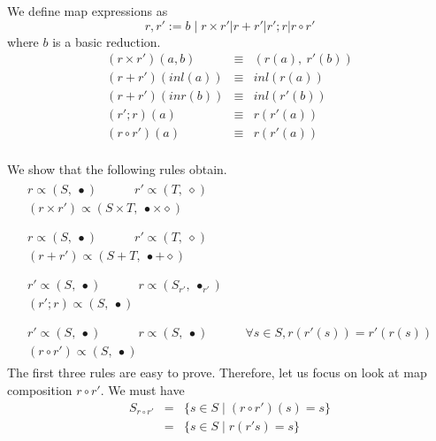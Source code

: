 We define map expressions as 
\[
r, r' := b \mid r \times r' | r + r' | r' ; r | r \circ r'
\]
where $b$ is a basic reduction. 
\[
\begin{array}{rcl}
  ( r \times r') (a, b) & \equiv & (r(a),\ r'(b)) \\
  ( r + r') (inl(a)) & \equiv & inl (r (a)) \\
  ( r + r') (inr(b)) & \equiv & inl (r' (b)) \\
  ( r' ; r)(a) & \equiv & r (r'(a)) \\    
  ( r \circ r')(a) & \equiv & r (r'(a)) \\  
\end{array}   
\] 

We show that the following rules obtain. 
\[
\begin{array}{c}
  \begin{array}{c}
  r \propto (S,\ \bullet) \quad \quad \quad r' \propto (T,\ \diamond) \\ \hline
  (r \times r') \propto (S \times T,\ \bullet \times \diamond)
  \end{array}     
  \\
  \\
  \begin{array}{c}
  r \propto (S,\ \bullet) \quad \quad \quad r' \propto (T,\ \diamond) \\ \hline
  (r + r') \propto (S + T,\ \bullet + \diamond)
  \end{array}     
  \\
  \\
  \begin{array}{c}
  r' \propto (S,\ \bullet) \quad \quad \quad r \propto (S_{r'},\ \bullet_{r'}) \\ \hline
  (r' ; r) \propto (S,\ \bullet)
  \end{array}     
  \\
  \\
  \begin{array}{c}
  r' \propto (S,\ \bullet) \quad \quad \quad r \propto (S,\ \bullet) \quad \quad \quad \forall s \in S, r(r'(s)) = r'(r(s))\\ \hline
  (r \circ r') \propto (S,\ \bullet)
  \end{array}     
\end{array}   
\] 
The first three rules are easy to prove.
Therefore, let us focus on look at map composition $r \circ r'$. 
We must have
\[
\begin{array}{rcl}
  S_{r \circ r'} & = & \{s \in S\mid (r \circ r')(s) = s\} \\
               & = & \{s \in S\mid r (r' s) = s\} 
\end{array}   
\] 
